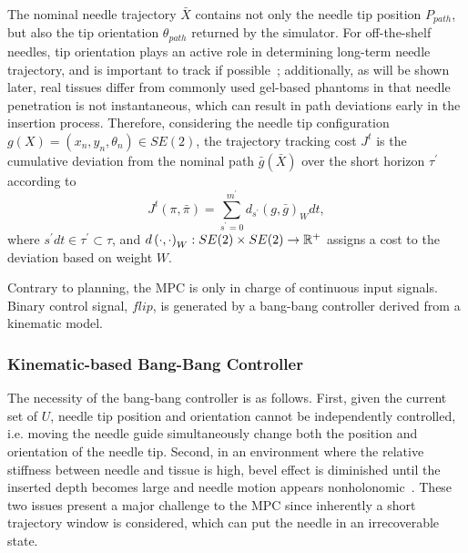 The nominal needle trajectory $\bar{X}$ contains not only the needle tip position $P_{path}$, but also the tip orientation $\theta_{path}$ returned by the simulator. For off-the-shelf needles, tip orientation plays an active role in determining long-term needle trajectory, and is important to track if possible~\parencite{wangShapeManipulationBevelTip2024}; additionally, as will be shown later, real tissues differ from commonly used gel-based phantoms in that needle penetration is not instantaneous, which can result in path deviations early in the insertion process. Therefore, considering the needle tip configuration $g(X) = \left( x_n, y_n, \theta_n \right)\in SE(2)$, the trajectory tracking cost $J^t$ is the cumulative deviation from the nominal path $\bar{g}(\bar{X})$ over the short horizon $\tau^{\prime}$ according to
\begin{equation}
  \label{eq:chap-5-exec-cost}
  J^t(\pi, \bar{\pi}) = \sum_{s^{\prime} = 0}^{m^{\prime}}d_{s^{\prime}} \left( g, \bar{g} \right)_Wdt,
\end{equation}
where $s^{\prime}dt \in \tau^{\prime} \subset \tau$, and $d \left( \cdot, \cdot \right)_W : SE(2)\times SE(2) \to \mathbb{R}^+$ assigns a cost to the deviation based on weight $W$.

Contrary to planning, the MPC is only in charge of continuous input signals. Binary control signal, $flip$, is generated by a bang-bang controller derived from a kinematic model.

\subsubsection{Kinematic-based Bang-Bang Controller}
\label{sec:chap-5-kinematic-models}
The necessity of the bang-bang controller is as follows. First, given the current set of $U$, needle tip position and orientation cannot be independently controlled, i.e. moving the needle guide simultaneously change both the position and orientation of the needle tip. Second, in an environment where the relative stiffness between needle and tissue is high, bevel effect is diminished until the inserted depth becomes large and needle motion appears nonholonomic~\parencite{lehmannDeflectionModelingNeedle2017}. These two issues present a major challenge to the MPC since inherently a short trajectory window is considered, which can put the needle in an irrecoverable state.


